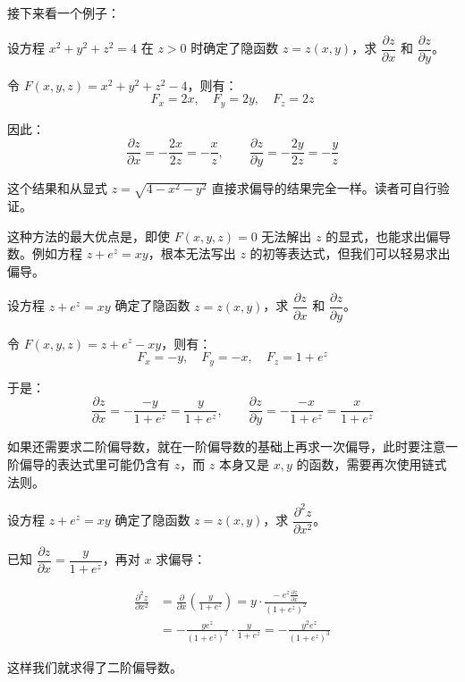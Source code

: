 接下来看一个例子：

\begin{myexample}
设方程 $x^2 + y^2 + z^2 = 4$ 在 $z > 0$ 时确定了隐函数 $z = z(x,y)$，求 $\dfrac{\partial z}{\partial x}$ 和 $\dfrac{\partial z}{\partial y}$。

令 $F(x, y, z) = x^2 + y^2 + z^2 - 4$，则有：
\[
F_x = 2x,\quad F_y = 2y,\quad F_z = 2z
\]

因此：
\[
\frac{\partial z}{\partial x} = -\frac{2x}{2z} = -\frac{x}{z},\qquad
\frac{\partial z}{\partial y} = -\frac{2y}{2z} = -\frac{y}{z}
\]

这个结果和从显式 $z = \sqrt{4 - x^2 - y^2}$ 直接求偏导的结果完全一样。读者可自行验证。
\end{myexample}

这种方法的最大优点是，即使 $F(x,y,z)=0$ 无法解出 $z$ 的显式，也能求出偏导数。例如方程 $z + e^z = xy$，根本无法写出 $z$ 的初等表达式，但我们可以轻易求出偏导。

\begin{myexample}
设方程 $z + e^z = xy$ 确定了隐函数 $z = z(x,y)$，求 $\dfrac{\partial z}{\partial x}$ 和 $\dfrac{\partial z}{\partial y}$。

令 $F(x, y, z) = z + e^z - xy$，则有：
\[
F_x = -y,\quad F_y = -x,\quad F_z = 1 + e^z
\]

于是：
\[
\frac{\partial z}{\partial x} = -\frac{-y}{1 + e^z} = \frac{y}{1 + e^z},\qquad
\frac{\partial z}{\partial y} = -\frac{-x}{1 + e^z} = \frac{x}{1 + e^z}
\]
\end{myexample}

如果还需要求二阶偏导数，就在一阶偏导数的基础上再求一次偏导，此时要注意一阶偏导的表达式里可能仍含有 $z$，而 $z$ 本身又是 $x,y$ 的函数，需要再次使用链式法则。

\begin{myexample}
设方程 $z + e^z = xy$ 确定了隐函数 $z = z(x,y)$，求 $\dfrac{\partial^2 z}{\partial x^2}$。

已知 $\dfrac{\partial z}{\partial x} = \dfrac{y}{1 + e^z}$，再对 $x$ 求偏导：

\begin{align*}
\frac{\partial^2 z}{\partial x^2}
&= \frac{\partial}{\partial x}( \frac{y}{1 + e^z} )
 = y \cdot \frac{-\; e^z \frac{\partial z}{\partial x}}{(1 + e^z)^2} \\
&= -\frac{y e^z}{(1 + e^z)^2} \cdot \frac{y}{1 + e^z}
 = -\frac{y^2 e^z}{(1 + e^z)^3}
\end{align*}

这样我们就求得了二阶偏导数。
\end{myexample}

